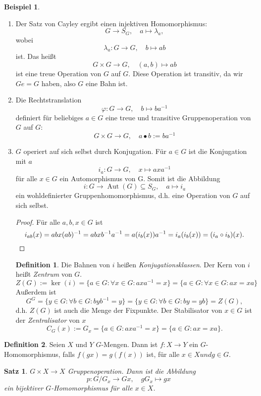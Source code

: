 \documentclass[12pt]{scrartcl} %
\DeclareMathOperator{\Aut}{Aut}
\newtheorem{thm}{Satz}[section]
\theoremstyle{definition}
\newtheorem*{defn}{Definition}
\newtheorem{ex}{Beispiel}
\theoremstyle{remark}
\newcommand{\defi}{\emph}
\begin{document}
\begin{ex}
	\begin{enumerate}
	\item Der Satz von Cayley ergibt einen injektiven Homomorphismus:
		$$G \to S_G, \quad a \mapsto \lambda_a,$$ wobei $$\lambda_a: G \to G, \quad b \mapsto ab$$ ist.
		Das heißt $$G\times G \to G, \quad (a,b) \mapsto ab$$ ist eine treue Operation von \(G\) auf \(G\).
		Diese Operation ist transitiv, da wir $Ge=G$ haben, also $G$ eine Bahn ist.
	\item Die Rechtstranslation
		$$\varphi : G \to G, \quad b \mapsto ba^{-1}$$
		definiert für beliebiges $a\in G$ eine treue und transitive Gruppenoperation von $G$ auf $G$:
		$$G \times G \to G, \quad a \bullet b := ba^{-1}$$
	\item $G$ operiert auf sich selbst durch Konjugation.
		Für \(a \in G\) ist die Konjugation mit $a$
		$$i_a : G \to G, \quad x \mapsto axa^{-1}$$
		für alle $x \in G$ ein Automorphismus von G. Somit ist die Abbildung
		$$i: G \to \Aut(G) \subseteq S_G, \quad a \mapsto i_a$$
		ein wohldefinierter Gruppenhomomorphismus, d.h. eine Operation von $G$ auf sich selbst.
		\begin{proof}
			Für alle \(a, b, x \in G\) ist \[i_{ab}(x)=abx(ab)^{-1}=abxb^{-1}a^{-1}=a(i_b(x))a^{-1}=i_a(i_b(x))=(i_a\circ i_b)(x).\qedhere\]
		\end{proof}
		\begin{defn}
			Die Bahnen von $i$ heißen \defi{Konjugationsklassen}.
			Der Kern von $i$ heißt \defi{Zentrum} von $G$.
			\[Z(G) := \ker(i) = \{a \in G : \forall x \in G: axa^{-1}=x\} = \{a \in G : \forall x \in G: ax =xa\}\]
			Außerdem ist \[G^G = \{y \in G : \forall b \in G: byb^{-1}=y\} = \{y \in G: \forall b \in G: by = yb\} = Z(G),\]	
			d.h. $Z(G)$ ist auch die Menge der Fixpunkte.
			Der Stabilisator von $x \in G$ ist der \defi{Zentralisator} von \(x\) \[C_G(x) := G_x = \{a \in G : axa^{-1}=x\} = \{ a \in G : ax = xa\}.\]
		\end{defn}		
	\end{enumerate}
\end{ex}

\begin{defn}
	Seien $X$ und $Y$ $G$-Mengen.
	Dann ist $f: X \rightarrow Y$ ein $G$-Homomorphismus, falls $f(gx)=g(f(x))$ ist, für alle $x \in X und g \in G$.
\end{defn}

\begin{thm}
	$G \times X \rightarrow X$ Gruppenoperation. Dann ist die Abbildung
	$$p: G/G_x \to Gx, \quad gG_x \mapsto gx$$
	ein bijektiver $G$-Homomorphismus für alle $x \in X$.
\end{thm}
\end{document}
